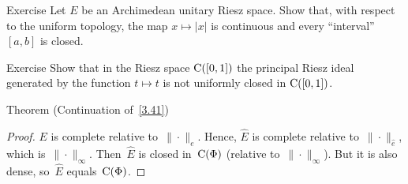 \documentclass[main.tex]{subfiles}
\begin{document}
%
%
\begin{psec}{4.3}{Exercise}
Let $E$ be an Archimedean unitary Riesz space.
Show that,
with respect to the uniform topology,
the map $x\mapsto|x|$
is continuous
and every ``interval'' $[a,b]$ is closed.
\end{psec}
%
%
\begin{psec}{4.4}{Exercise}
Show that in the Riesz space $\mathrm{C}([0,1])$
the principal Riesz ideal
generated by the function $t\mapsto t$
is not uniformly closed in $\mathrm{C}([0,1])$.
\end{psec}
%
%
\begin{psec}{4.5}{Theorem}
(Continuation of~\ref{3.41})
\end{psec}
\begin{proof}
$E$ is complete relative to~$\|\cdot\|_e$.
Hence, $\hat{E}$ is complete relative to~$\|\cdot\|_{\hat{e}}$,
which is~$\|\cdot\|_\infty$.
Then~$\hat{E}$ is closed in~$\mathrm{C}(\Phi)$
(relative to~$\|\cdot\|_\infty$).
But it is also dense,
so~$\hat{E}$ equals~$\mathrm{C}(\Phi)$. \xqed
\end{proof}
\clearpage
\end{document}

